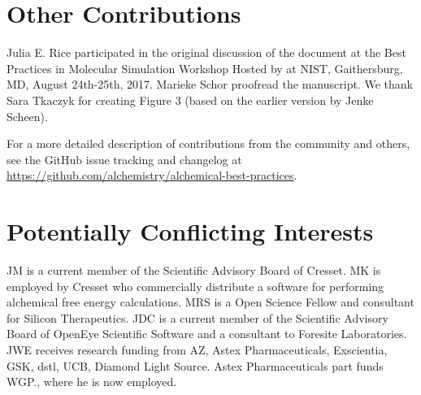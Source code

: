 \documentclass[9pt,bestpractices]{livecoms}
\newcommand{\githubrepository}{\url{https://github.com/alchemistry/alchemical-best-practices}} %
\begin{document}
\section*{Other Contributions}
%
Julia E. Rice participated in the original discussion of the document at the Best Practices in Molecular Simulation Workshop Hosted by at NIST, Gaithersburg, MD, August 24th-25th, 2017.
Marieke Schor proofread the manuscript. 
We thank Sara Tkaczyk for creating Figure 3 (based on the earlier version by Jenke Scheen).

For a more detailed description of contributions from the community and others, 
see the GitHub issue tracking and changelog at \githubrepository.


\section*{Potentially Conflicting Interests}
JM is a current member of the Scientific Advisory Board of Cresset. 
MK is employed by Cresset who commercially distribute a software for performing alchemical free energy calculations. MRS is a Open Science Fellow and consultant for Silicon Therapeutics.
JDC is a current member of the Scientific Advisory Board of OpenEye Scientific Software and a consultant to Foresite Laboratories.
JWE receives research funding from AZ, Astex Pharmaceuticals, Exscientia, GSK, dstl, UCB, Diamond Light Source. Astex Pharmaceuticals part funds WGP., where he is now employed.
\end{document}
